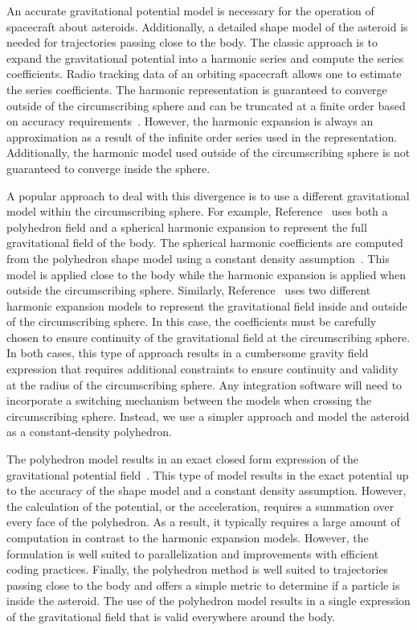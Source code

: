 An accurate gravitational potential model is necessary for the operation of spacecraft about asteroids.
Additionally, a detailed shape model of the asteroid is needed for trajectories passing close to the body.
The classic approach is to expand the gravitational potential into a harmonic series and compute the series coefficients.
Radio tracking data of an orbiting spacecraft allows one to estimate the series coefficients.
The harmonic representation is guaranteed to converge outside of the circumscribing sphere and can be truncated at a finite order based on accuracy requirements~\cite{scheeres2012a}.
However, the harmonic expansion is always an approximation as a result of the infinite order series used in the representation.
Additionally, the harmonic model used outside of the circumscribing sphere is not guaranteed to converge inside the sphere.

A popular approach to deal with this divergence is to use a different gravitational model within the circumscribing sphere.
For example, Reference~\cite{scheeres2000} uses both a polyhedron field and a spherical harmonic expansion to represent the full gravitational field of the body.
The spherical harmonic coefficients are computed from the polyhedron shape model using a constant density assumption~\cite{werner1997}.
This model is applied close to the body while the harmonic expansion is applied when outside the circumscribing sphere.
Similarly, Reference~\cite{herrera2014} uses two different harmonic expansion models to represent the gravitational field inside and outside of the circumscribing sphere.
In this case, the coefficients must be carefully chosen to ensure continuity of the gravitational field at the circumscribing sphere.
In both cases, this type of approach results in a cumbersome gravity field expression that requires additional constraints to ensure continuity and validity at the radius of the circumscribing sphere.
Any integration software will need to incorporate a switching mechanism between the models when crossing the circumscribing sphere.
Instead, we use a simpler approach and model the asteroid as a constant-density polyhedron.

The polyhedron model results in an exact closed form expression of the gravitational potential field~\cite{werner1994,werner1996}.
This type of model results in the exact potential up to the accuracy of the shape model and a constant density assumption.
However, the calculation of the potential, or the acceleration, requires a summation over every face of the polyhedron. 
As a result, it typically requires a large amount of computation in contrast to the harmonic expansion models. 
However, the formulation is well suited to parallelization and improvements with efficient coding practices. 
Finally, the polyhedron method is well suited to trajectories passing close to the body and offers a simple metric to determine if a particle is inside the asteroid.
The use of the polyhedron model results in a single expression of the gravitational field that is valid everywhere around the body.

